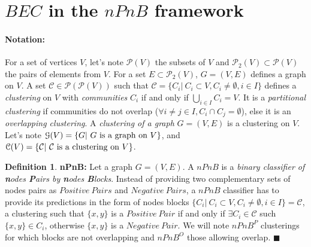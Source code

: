\documentclass[12pt]{article}
\theoremstyle{thmstyleone}%
\theoremstyle{definition}
\newtheorem{definition}{Definition}
\begin{document}
\section{$BEC$ in the $nPnB$ framework \label{nPnB}}
\paragraph{Notation:} For a set of vertices $V$, let's note $\mathcal{P}(V)$ the subsets of $V$ and $\mathcal{P}_2(V)\subset \mathcal{P}(V)$ the pairs of elements from $V$. For a set $E\subset \mathcal{P}_2(V)$, $G=(V,E)$ defines a graph on $V$.
%
A set $\mathcal{C}\in \mathcal{P}(\mathcal{P}(V))$ such that $\mathcal{C}=\{C_i|~C_i \subset V, C_i \neq \emptyset, i \in I\}$ defines a
{\it clustering} on $V$ with {\it communities} $C_i$ if and only if $\bigcup_{i \in I} C_i=V$. It is a \textit{partitional clustering} if communities do not overlap ($\forall i\neq j \in I, C_i \cap C_j =\emptyset$), else it is an \textit{overlapping clustering}.
%
A {\it clustering of a graph} $G=(V,E)$ is a clustering on $V$.
%
Let's note $\EuScript{G}(V)=\{G |~G \text{ is a graph on } V\}$, and $\EuScript{C}(V)=\{\mathcal{C} |~\mathcal{C} \text{ is a clustering on } V\}$.

\noindent
\begin{definition} {\bf nPnB:}
Let a graph $G=(V,E)$. A $nPnB$ is a \textit{binary classifier of {\bf n}odes {\bf P}airs by {\bf n}odes {\bf B}locks}.
Instead of providing two complementary sets of nodes pairs as $Positive~Pairs$ and $Negative~Pairs$, a $nPnB$ classifier has to provide its predictions in the form of nodes blocks $\{C_i|~C_i \subset V, C_i \neq \emptyset, i \in I\}=\mathcal{C}$, a clustering such that $\{x,y\}$
is a $Positive~Pair$ if and only if $\exists C_i \in \mathcal{C}$ such $\{x,y\} \in C_i$, otherwise $\{x,y\} $ is a $Negative~Pair$. We will note $nPnB^{P}$ clusterings for which blocks are not overlapping and $nPnB^{O}$ those allowing overlap.
$\blacksquare$
\end{definition}
\end{document}
